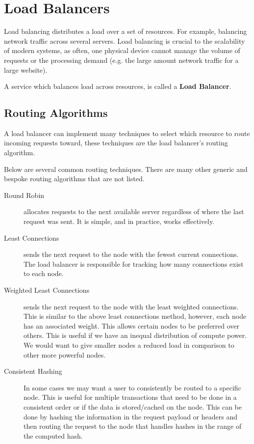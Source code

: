 \documentclass{csse4400}
\begin{document}
\section{Load Balancers}

Load balancing distributes a load over a set of resources.
For example, balancing network traffic across several servers.
Load balancing is crucial to the scalability of modern systems, as often,
one physical device cannot manage the volume of requests or the processing demand
(e.g. the large amount network traffic for a large website).

A service which balances load across resources, is called a \textbf{Load Balancer}.

\subsection{Routing Algorithms}

A load balancer can implement many techniques to select which resource to route incoming requests toward,
these techniques are the load balancer's routing algorithm.

Below are several common routing techniques.
There are many other generic and bespoke routing algorithms that are not listed.

\begin{description}
  \item[Round Robin] allocates requests to the next available server regardless of where the last request was sent.
      It is simple, and in practice, works effectively.
  \item[Least Connections] sends the next request to the node with the fewest current connections.
      The load balancer is responsible for tracking how many connections exist to each node.
  \item[Weighted Least Connections] sends the next request to the node with the least weighted connections. This is similar to the above least connections method, however, each node has an associated weight.
      This allows certain nodes to be preferred over others.
      This is useful if we have an inequal distribution of compute power.
      We would want to give smaller nodes a reduced load in comparison to other more powerful nodes.
  \item[Consistent Hashing] In some cases we may want a user to consistently be routed to a specific node.
      This is useful for multiple transactions that need to be done in a consistent order or if the data is stored/cached on the node.
      This can be done by hashing the information in the request payload or headers and then routing the request to the node that handles hashes in the range of the computed hash.
\end{description}
\end{document}
